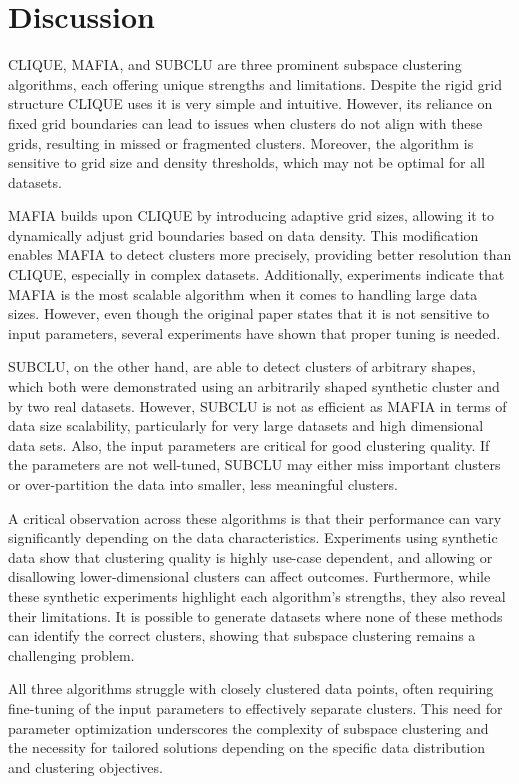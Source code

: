 \section{Discussion}
CLIQUE, MAFIA, and SUBCLU are three prominent subspace clustering algorithms, each offering unique strengths and limitations. Despite the rigid grid structure CLIQUE uses it is very simple and intuitive. However, its reliance on fixed grid boundaries can lead to issues when clusters do not align with these grids, resulting in missed or fragmented clusters. Moreover, the algorithm is sensitive to grid size and density thresholds, which may not be optimal for all datasets.

MAFIA builds upon CLIQUE by introducing adaptive grid sizes, allowing it to dynamically adjust grid boundaries based on data density. This modification enables MAFIA to detect clusters more precisely, providing better resolution than CLIQUE, especially in complex datasets. Additionally, experiments indicate that MAFIA is the most scalable algorithm when it comes to handling large data sizes. However, even though the original paper states that it is not sensitive to input parameters, several experiments have shown that proper tuning is needed.

SUBCLU, on the other hand, are able to detect clusters of arbitrary shapes, which both were demonstrated using an arbitrarily shaped synthetic cluster and by two real datasets. However, SUBCLU is not as efficient as MAFIA in terms of data size scalability, particularly for very large datasets and high dimensional data sets. Also, the input parameters are critical for good clustering quality. If the parameters are not well-tuned, SUBCLU may either miss important clusters or over-partition the data into smaller, less meaningful clusters.

A critical observation across these algorithms is that their performance can vary significantly depending on the data characteristics. Experiments using synthetic data show that clustering quality is highly use-case dependent, and allowing or disallowing lower-dimensional clusters can affect outcomes. Furthermore, while these synthetic experiments highlight each algorithm’s strengths, they also reveal their limitations. It is possible to generate datasets where none of these methods can identify the correct clusters, showing that subspace clustering remains a challenging problem.

All three algorithms struggle with closely clustered data points, often requiring fine-tuning of the input parameters to effectively separate clusters. This need for parameter optimization underscores the complexity of subspace clustering and the necessity for tailored solutions depending on the specific data distribution and clustering objectives.

